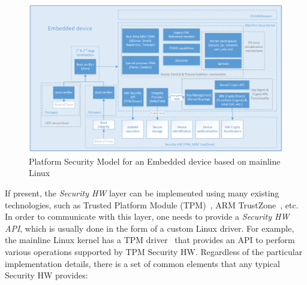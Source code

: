 

\begin{figure}[t]
	\centering
		\includegraphics[width=1\textwidth]{figures/LinuxKernelPlatSecModel.png}
	\caption{Platform Security Model for an Embedded device based on mainline Linux}
	\label{fig:platsec}
\end{figure}

If present, the \textit{Security HW} layer can be implemented using many existing technologies, such as Trusted Platform Module (TPM)~\cite{tpm}, ARM TrustZone~\cite{trustzone}, etc. In order to communicate with this layer, one needs to provide a \textit{Security HW API}, which is usually done in the form of a custom Linux driver. For example, the mainline Linux kernel has a TPM driver~\cite{tpmdriver} that provides an API to perform various operations supported by TPM Security HW. Regardless of the particular implementation details, there is a set of common elements that any typical Security HW provides:

